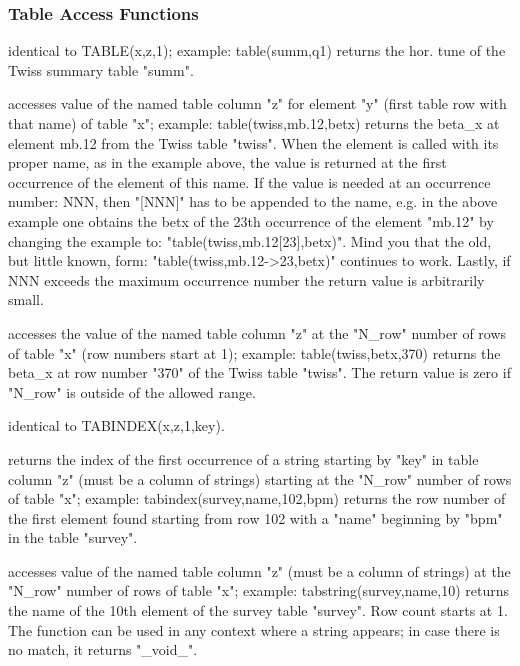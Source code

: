 \subsubsection{Table Access Functions}
\label{subsubsec:table}

\begin{madlist}
   identical to TABLE(x,z,1); example: table(summ,q1) returns the hor. tune of
  the Twiss summary table "summ".

   accesses value of the named table column "z"
  for element "y" (first table row with that name) of table "x";
  example: table(twiss,mb.12,betx) returns the beta\_x at
  element mb.12 from the Twiss table "twiss".   When the element
  is called with its proper name, as in the example above, the
  value is returned at the first occurrence of the element of
  this name. If the value is needed at an occurrence number: NNN,
  then "[NNN]" has to be appended to the name, e.g. in the above
  example one obtains the betx of the 23th occurrence of the
  element "mb.12" by changing the example to:
  "table(twiss,mb.12[23],betx)". Mind you that the old, but
  little known, form: "table(twiss,mb.12-\textgreater 23,betx)"
  continues to work. Lastly, if NNN exceeds the maximum
  occurrence number the return value is arbitrarily small.  

   accesses the value of the named table
    column  "z" at the "N\_row" number of rows of table "x" (row
    numbers start at  1); example: table(twiss,betx,370) returns
    the beta\_x at row number  "370" of the Twiss table
    "twiss". The return value is zero if "N\_row"  is outside of
    the allowed range.

   identical to TABINDEX(x,z,1,key).  

   returns the index of the first occurrence of a string starting by "key" in table column "z" (must be a column of strings) starting at the "N\_row" number of rows of table "x"; example: tabindex(survey,name,102,bpm) returns the row number of the first element found starting from row 102 with a "name" beginning by "bpm" in the table "survey".

 accesses value of the named table
 column "z" (must be a column of strings) at the "N\_row" number of rows of table "x";
example: tabstring(survey,name,10) returns the name of
the 10th element of the survey table "survey". Row count starts at 1. The
function can be used in any context where a string appears; in case
there is no match, it returns "\_void\_".  
\end{madlist}

